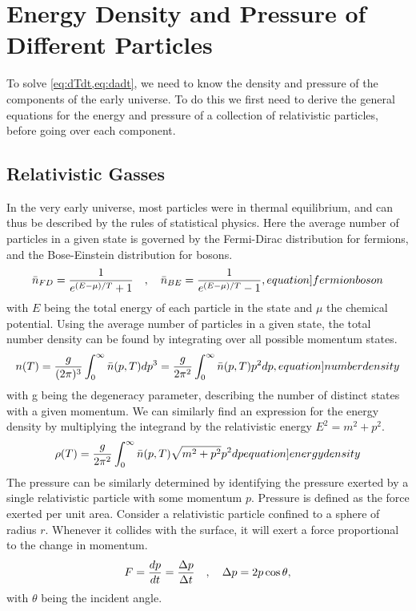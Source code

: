 

\section{Energy Density and Pressure of Different Particles}
To solve \cref{eq:dTdt,eq:dadt}, we need to know the density and pressure of the components of the early universe. To do this we first need to derive the general equations for the energy and pressure of a collection of relativistic particles, before going over each component.

\subsection{Relativistic Gasses}
In the very early universe, most particles were in thermal equilibrium, and can thus be described by the rules of statistical physics. Here the average number of particles in a given state is governed by the Fermi-Dirac distribution for fermions, and the Bose-Einstein distribution for bosons.
\begin{align}
    \bar{n}_{FD}=\frac{1}{e^{(E-\mu)/T}+1} \eqsep   \bar{n}_{BE}=\frac{1}{e^{(E-\mu)/T}-1},
    \label[equation]{fermionboson}
\end{align}
with $E$ being the total energy of each particle in the state and $\mu$ the chemical potential. Using the average number of particles in a given state, the total number density can be found by integrating over all possible momentum states. 
\begin{align}
    n(T)=\frac{g}{(2\pi)^3}\int_{0}^{\infty}\bar{n}(p,T)dp^3=\frac{g}{2\pi^2}\int_{0}^{\infty}\bar{n}(p,T) p^2 dp,
    \label[equation]{numberdensity}
\end{align}
with g being the degeneracy parameter, describing the number of distinct states with a given momentum. We can similarly find an expression for the energy density by multiplying the integrand by the relativistic energy $E^2=m^2+p^2$.
\begin{align}
    \rho(T)=\frac{g}{2\pi^2}\int_{0}^{\infty}\bar{n}(p,T)\sqrt{m^2+p^2} p^2 dp
    \label[equation]{energydensity}
\end{align}
The pressure can be similarly determined by identifying the pressure exerted by a single relativistic particle with some momentum $p$.
Pressure is defined as the force exerted per unit area. Consider a relativistic particle confined to a sphere of radius $r$. Whenever it collides with the surface, it will exert a force proportional to the change in momentum. 
\begin{align}
    F=\frac{dp}{dt}=\frac{\Delta p }{\Delta t}\quad , \quad
    \Delta p = 2p \cos \theta,
    \label{eq:pressureF}
\end{align}
with $\theta$ being the incident angle. 

